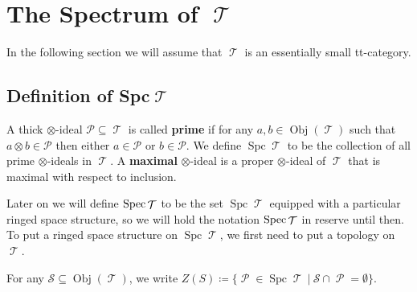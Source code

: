\documentclass[11pt]{article}
\DeclareMathOperator{\ob}{Obj}
\DeclareMathOperator{\TT}{\mathcal{T}}
\DeclareMathOperator{\cP}{\mathcal{P}}
\DeclareMathOperator{\spc}{Spc}
\begin{document}
\newpage

\section{The Spectrum of \texorpdfstring{$\TT$}{𝓣}}

In the following section we will assume that $\TT$ is an essentially small tt-category.

\subsection{Definition of Spc\texorpdfstring{$\TT$}{𝓣}}

\begin{defn}
A thick $\otimes$-ideal $\mathcal{P} \subseteq \TT$ is called \textbf{prime} if for any $a,b \in \ob(\TT)$ such that $a \otimes b \in \mathcal{P}$ then either $a \in \mathcal{P}$ or $b \in \mathcal{P}$. We define $\spc \TT$ to be the collection of all prime $\otimes$-ideals in $\TT$. A \textbf{maximal} $\otimes$-ideal is a proper $\otimes$-ideal of $\TT$ that is maximal with respect to inclusion.
\end{defn}

Later on we will define $\Spec \TT $ to be the set $\spc \TT$ equipped with a particular ringed space structure, so we will hold the notation $\Spec \TT$ in reserve until then. To put a ringed space structure on $\spc \TT$, we first need to put a topology on $\TT$.

\begin{defn}
For any $\mathcal{S} \subseteq \ob(\TT)$, we write $Z(S) \coloneqq \{\cP \in \spc \TT\:|\:\mathcal{S}\cap \cP = \emptyset\}$.
\end{defn}
\end{document}
